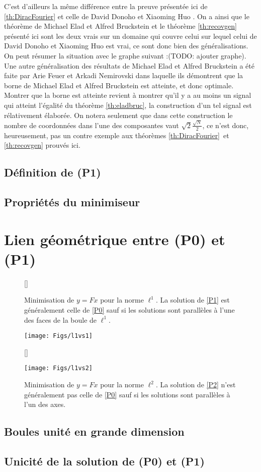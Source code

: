 C'est d'ailleurs la même différence entre la preuve présentée ici de \ref{th:DiracFourier} et celle de David Donoho et Xiaoming Huo \cite{DonohoHuo}.
\newline
On a ainsi que le théorème de Michael Elad et Alfred Bruckstein et le théorème \ref{th:recovgen} présenté ici sont les deux vrais sur un domaine qui couvre celui sur lequel celui de David Donoho et Xiaoming Huo est vrai, ce sont donc bien des généralisations.
On peut résumer la situation avec le graphe suivant :(TODO: ajouter graphe).
\newline
Une autre généralisation des résultats de Michael Elad et Alfred Bruckstein a été faite par Arie Feuer et Arkadi Nemirovski \cite{feuer} dans laquelle ils démontrent que la borne de Michael Elad et Alfred Bruckstein est atteinte, et donc optimale.
Montrer que  la borne est atteinte revient à montrer qu'il y a au moins un signal qui atteint l'égalité du théorème \ref{th:eladbruc}, la construction d'un tel signal est rélativement élaborée. 
On notera seulement que dans cette construction le nombre de coordonnées dans l'une des composantes vaut $\sqrt{2}\frac{\sqrt{N}}{2}$, ce n'est donc, heureusement, pas un contre exemple aux théorèmes \ref{th:DiracFourier} et \ref{th:recovgen} prouvés ici.


\subsection{Définition de (P1)}
\subsection{Propriétés du minimiseur}

\section{Lien géométrique entre (P0) et (P1)}
\begin{figure}[h]
	[\FBwidth]
	{\caption{Minimisation de $y=Fx$ pour la norme $\ell^1$. La solution de \ref{P1} est généralement celle de \ref{P0} sauf si les solutions sont parallèles à l'une des faces de la boule de $\ell^1$.}}
	{\texttt{[image: Figs/l1vs1]}}
	
	[\FBwidth]
	{\caption{Minimisation de $y=Fx$ pour la norme $\ell^2$. La solution de \ref{P2} n'est généralement pas celle de \ref{P0} sauf si les solutions sont parallèles à l'un des axes.}}
	{\texttt{[image: Figs/l1vs2]}}
	
	\end{figure}

\subsection{Boules unité en grande dimension}
\subsection{Unicité de la solution de (P0) et (P1)}


